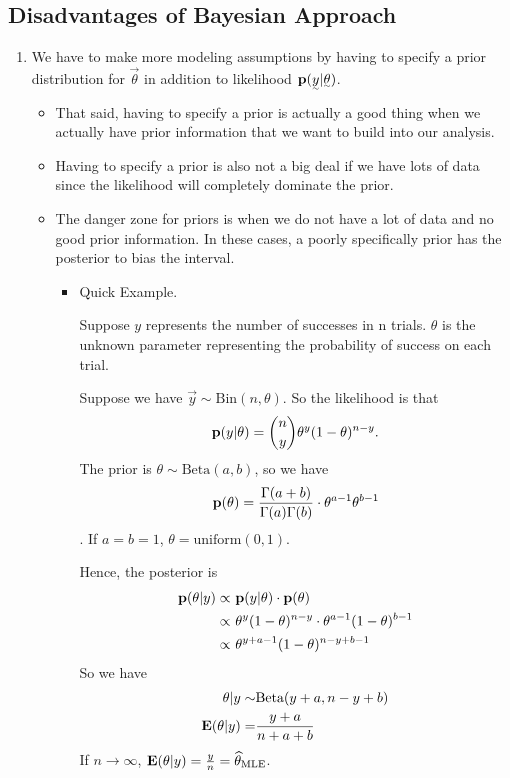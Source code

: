 \subsection{Disadvantages of Bayesian Approach}
\begin{enumerate}
    \item We have to make more modeling assumptions by having to specify a prior distribution for $\vec{\theta}$ in addition to likelihood $\p(\vec{y}| \vec{\theta})$. 
    \begin{itemize}
        \item That said, having to specify a prior is actually a good thing when we actually have prior information that we want to build into our analysis.
        \item Having to specify a prior is also not a big deal if we have lots of data since the likelihood will completely dominate the prior.
        \item The danger zone for priors is when we do not have a lot of data and no good prior information. In these cases, a poorly specifically prior has the posterior to bias the interval.
        \begin{itemize}
            \item Quick Example.
            
            Suppose $y$ represents the number of successes in n trials. $\theta$ is the unknown parameter representing the probability of success on each trial. 
            
            Suppose we have $\vec{y} \sim \text{Bin}(n, \theta)$. So the likelihood is that 
            \[
                {\mathbf p}(y|\theta) = \binom{n}{y}\theta^y(1-\theta)^{n-y}.
            \]
            The prior is $\theta \sim \text{Beta}(a, b)$,  so we have 
            \[
                {\mathbf p}(\theta) = \frac{\Gamma(a+b)}{\Gamma(a) \Gamma(b)} \cdot \theta^{a-1} \theta^{b-1}
            \]. 
            If $a=b=1$, $\theta = \text{uniform}(0, 1)$.
            
            Hence, the posterior is 
            \begin{align*}
                {\mathbf p}(\theta|y) 
                \propto& ~{\mathbf p}(y| \theta) \cdot {\mathbf p}(\theta)\\
                \propto& ~\theta^y(1-\theta)^{n-y} \cdot \theta^{a-1} (1 - \theta)^{b-1}\\
                \propto& ~\theta^{y+a-1} (1-\theta)^{n-y+b-1}
            \end{align*}
            So we have
            \begin{align*}
                \theta| y \sim& \text{Beta}(y+a, n-y+b)\\
                {\mathbf E}(\theta| y) =& \frac{y+a}{n+a+b}
            \end{align*}
            If $n \rightarrow \infty$, ${\mathbf E}(\theta| y) = \frac{y}{n} = \widehat{\theta}_{\text{MLE}}$.
            

\end{itemize}
\end{itemize}
\end{enumerate}

